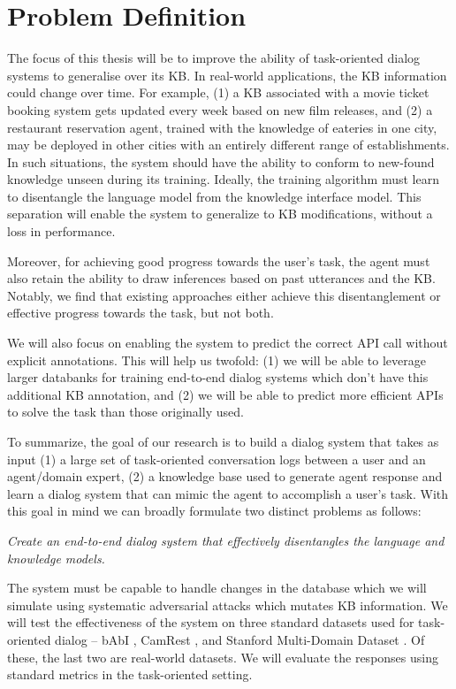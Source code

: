 \section{Problem Definition}
The focus of this thesis will be to improve the ability of task-oriented dialog systems to generalise over its KB.
In real-world applications, the KB information could change over time. For example, (1) a KB associated with a movie ticket booking system gets updated every week based on new film releases, and (2) a restaurant reservation agent, trained with the knowledge of eateries in one city, may be deployed in other cities with an entirely different range of establishments. In such situations, the system should have the ability to conform to new-found knowledge unseen during its training. Ideally, the training algorithm must learn to disentangle the language model from the knowledge interface model. This separation will enable the system to generalize to KB modifications, without a loss in performance. 

Moreover, for achieving good progress towards the user's task, the agent must also retain the ability to draw inferences based on past utterances and the KB. Notably, we find that existing approaches either achieve this disentanglement or effective progress towards the task, but not both. 

We will also focus on enabling the system to predict the correct API call without explicit annotations. This will help us twofold: (1) we will be able to leverage larger databanks for training end-to-end dialog systems which don't have this additional KB annotation, and (2) we will be able to predict more efficient APIs to solve the task than those originally used.

To summarize, the goal of our research is to build a dialog system that takes as input (1) a large set of task-oriented conversation logs between a user and an agent/domain expert, (2) a knowledge base used to generate agent response and learn a dialog system that can mimic the agent to accomplish a user's task. 
With this goal in mind we can broadly formulate two distinct problems as follows:

 {\em Create an end-to-end dialog system that effectively disentangles the language and knowledge models.}

The system must be capable to handle changes in the database which we will simulate using systematic adversarial attacks which mutates KB information. We will test the effectiveness of the system on three standard datasets used for task-oriented dialog -- bAbI \cite{BordesW16}, CamRest \cite{wenEMNLP2016}, and Stanford Multi-Domain Dataset \cite{Ericsigdial}. Of these, the last two are real-world datasets. We will evaluate the responses using standard metrics in the task-oriented setting.

